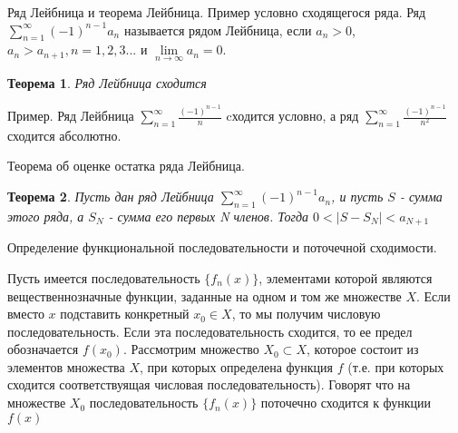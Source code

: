 \documentclass[12pt, a4paper]{article}
\newtheorem{thm}{Теорема}
\newenvironment{field}{}{\newpage}
\newif\ifnote
\newenvironment{note}{\notetrue}{\notefalse}
\begin{document}
\begin{note}
\begin{field}
Ряд Лейбница и теорема Лейбница. Пример условно сходящегося ряда.
\end{field}
\begin{field}
Ряд  $\sum_{n=1}^{\infty}(-1)^{n-1}a_n$ называется рядом Лейбница, если $a_n > 0$, $a_n > a_{n+1}, n = 1, 2, 3...$ и
$\lim\limits_{n \to \infty}a_n = 0$.
\begin{thm}
Ряд Лейбница сходится
\end{thm}
Пример. Ряд Лейбница $\sum\limits_{n=1}^{\infty}\frac{(-1)^{n - 1}}{n}$ cходится условно, а ряд  $\sum\limits_{n=1}^{\infty}\frac{(-1)^{n - 1}}{n^2}$ сходится абсолютно.


\end{field}
\end{note}

\begin{note}
\begin{field}
Теорема об оценке остатка ряда Лейбница.
\end{field}
\begin{field}
\begin{thm}
	Пусть дан ряд Лейбница $\sum\limits_{n=1}^{\infty}\left( -1 \right)^{n-1}a_n $, и пусть $S$ - сумма этого ряда, а $S_N$ - сумма его первых N членов. Тогда $0 < |S - S_N| < a_{N + 1}$
\end{thm}


\end{field}
\end{note}

\begin{note}
\begin{field}
Определение функциональной последовательности и поточечной сходимости.
\end{field}
\begin{field}

Пусть имеется последовательность $\{f_n(x)\}$, элементами которой являются вещественнозначные функции, заданные на одном и том же множестве $X$. Если вместо $x$ подставить конкретный $x_0 \in X$, то мы получим числовую последовательность. Если эта последовательность сходится, то ее предел обозначается $f(x_0)$. Рассмотрим множество $X_0 \subset X$, которое состоит из элементов множества $X$, при которых определена функция $f$ (т.е. при которых сходится соответствуящая числовая последовательность). Говорят что на множестве $X_0$ последовательность $\{f_n(x)\}$ поточечно сходится к функции $f(x)$

\end{field}
\end{note}
\end{document}
